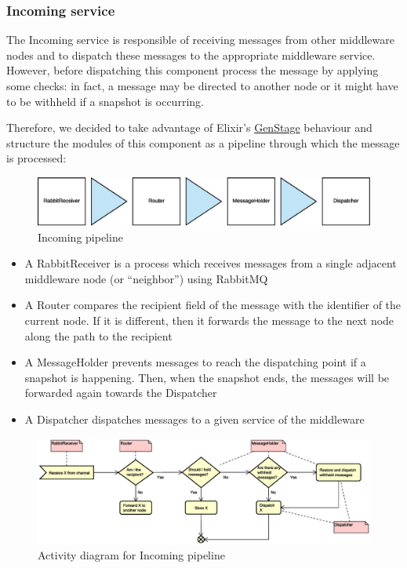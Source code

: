 \subsubsection{Incoming service}
The Incoming service is responsible of receiving messages from other
middleware nodes and to dispatch these messages to the appropriate middleware
service.
However, before dispatching this component process the message by applying some
checks: in fact, a message may be directed to another node or it might have to
be withheld if a snapshot is occurring.

Therefore, we decided to take advantage of Elixir's
\href{https://hexdocs.pm/gen_stage/GenStage.html}{GenStage} behaviour and
structure the modules of this component as a pipeline through which the
message is processed:

\begin{figure}[H]
  \centering
  \includegraphics[width=\columnwidth]{images/solution/mw/inc/architect.eps}
  \caption{Incoming pipeline}
  \label{fig:mw-incoming}
\end{figure}

\begin{itemize}
  \item A RabbitReceiver is a process which receives messages from a single
    adjacent middleware node (or ``neighbor'') using RabbitMQ
  \item A Router compares the recipient field of the message with the
    identifier of the current node. If it is different, then it forwards the
    message to the next node along the path to the recipient
  \item A MessageHolder prevents messages to reach the dispatching point if a
    snapshot is happening. Then, when the snapshot ends, the messages will be
    forwarded again towards the Dispatcher
  \item A Dispatcher dispatches messages to a given service of the middleware
\end{itemize}

\begin{figure}[H]
  \centering
  \includegraphics[width=\columnwidth]{images/solution/mw/inc/activity.eps}
  \caption{Activity diagram for Incoming pipeline}
  \label{fig:mw-incoming-activity}
\end{figure}

